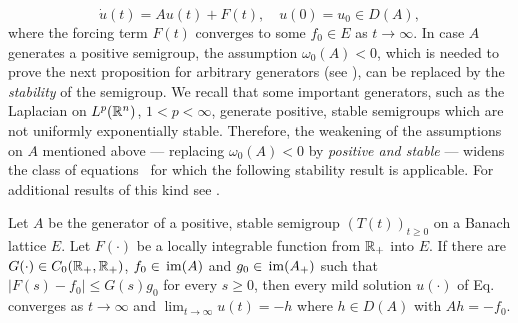 \begin{equation}\label{eq:c4-1.6}
\dot{u}(t) = Au(t) + F(t), \quad u(0) = u_{0} \in D(A) ,
\end{equation}
where the forcing term $F(t)$ converges to some $f_{0} \in E$ as $t \to \infty$.
In case $A$ generates a positive semigroup, the assumption \emph{$\omega_{0}(A) < 0$}, which is needed to prove the next proposition for arbitrary generators (see \textcite[ Theorem~4.4.4]{pazy:1983}), can be replaced by the \emph{stability} of the semigroup.
We recall that some important generators, such as the Laplacian on $L^{p}(\mathbb{R}^{n})$, $1 < p < \infty$, generate positive, stable semigroups which are not uniformly exponentially stable.
Therefore, the weakening of the assumptions on $A$ mentioned above --- \ie  replacing \emph{$\omega_{0}(A) < 0$} by \emph{positive and stable} --- widens the class of equations~ for which the following stability result is applicable.
For additional results of this kind see \textcite{neubrander:1985b}.
\begin{proposition}\label{prop:c4-1.11}
Let $A$ be the generator of a positive, stable semigroup $(T(t))_{t \geq 0}$ on a Banach lattice $E$.
Let $F(\cdot)$ be a locally integrable function from $\mathbb{R}_{+}$ into $E$.
If there are $G(\cdot) \in C_{0}(\mathbb{R}_{+},\mathbb{R}_{+})$, $f_{0} \in  \mathop{}\mathrm{im}(A)$ and $g_{0} \in \mathop{}\mathrm{im}(A_{+})$ such that $|F(s) - f_{0}| \leq G(s)g_{0}$ for every $s \geq 0$, then every mild solution $u(\cdot)$ of Eq.~ converges as $t \to \infty$ and $\lim_{t \to \infty} u(t) = -h$ where $h \in D(A)$ with $Ah = -f_{0}$.
\end{proposition}
